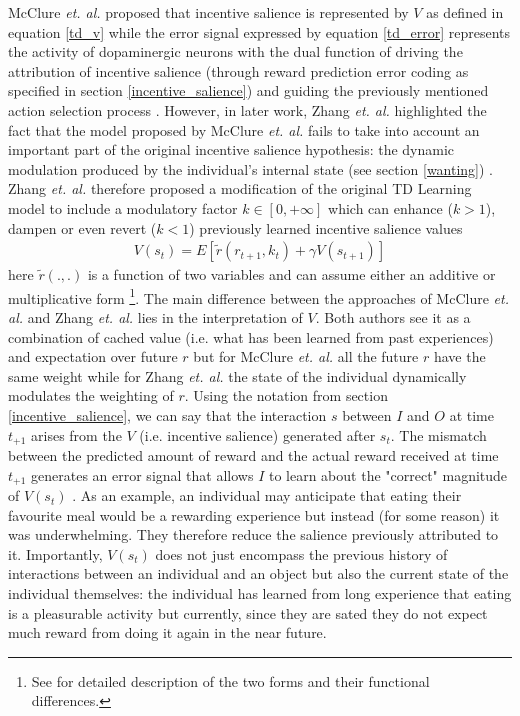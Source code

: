 
McClure \textit{et. al.} proposed that incentive salience is represented by $V$ as defined in equation \ref{td_v} while the error signal expressed by equation \ref{td_error} represents the activity of dopaminergic neurons with the dual function of driving the attribution of incentive salience (through reward prediction error coding as specified in section \ref{incentive_salience}) and guiding the previously mentioned action selection process \cite{schultz1997neural,mcclure2003computational,o2003temporal}. However, in later work, Zhang \textit{et. al.} highlighted the fact that the model proposed by McClure \textit{et. al.} fails to take into account an important part of the original incentive salience hypothesis: the dynamic modulation produced by the individual's internal state (see section \ref{wanting}) \cite{toates1994comparing,mcclure2003computational,berridge2004motivation,zhang2009neural,tindell2009dynamic,berridge2012prediction}. Zhang \textit{et. al.} therefore proposed a modification of the original TD Learning model to include a modulatory factor $k \in [0, +\infty]$ which can enhance ($k > 1$), dampen or even revert ($k < 1$) previously learned incentive salience values
\begin{align}
    \label{zhang_td_v}
    V(s_t) = E[\tilde{r}(r_{t+1},k_{t}) + \gamma V(s_{t+1})]
\end{align}
here $\tilde{r}(.,.)$ is a function of two variables and can assume either an additive or multiplicative form \footnote{See \cite{zhang2009neural} for detailed description of the two forms and their functional differences.}. The main difference between the approaches of McClure \textit{et. al.} and Zhang \textit{et. al.} lies in the interpretation of $V$. Both authors see it as a combination of cached value (i.e. what has been learned from past experiences) and expectation over future $r$ but for McClure \textit{et. al.} all the future $r$ have the same weight while for Zhang \textit{et. al.} the state of the individual dynamically modulates the weighting of $r$. Using the notation from section \ref{incentive_salience}, we can say that the interaction $s$ between $I$ and $O$ at time $t_{+1}$ arises from the $V$ (i.e. incentive salience) generated after $s_{t}$. The mismatch between the predicted amount of reward and the actual reward received at time $t_{+1}$ generates an error signal that allows $I$ to learn about the "correct" magnitude of $V(s_{t})$ \cite{schultz2017reward} . As an example, an individual may anticipate that eating their favourite meal would be a rewarding experience but instead (for some reason) it was underwhelming. They therefore reduce the salience previously attributed to it. Importantly, $V(s_{t})$ does not just encompass the previous history of interactions between an individual and an object but also the current state of the individual themselves: the individual has learned from long experience that eating is a pleasurable activity but currently, since they are sated they do not expect much reward from doing it again in the near future.  \\

